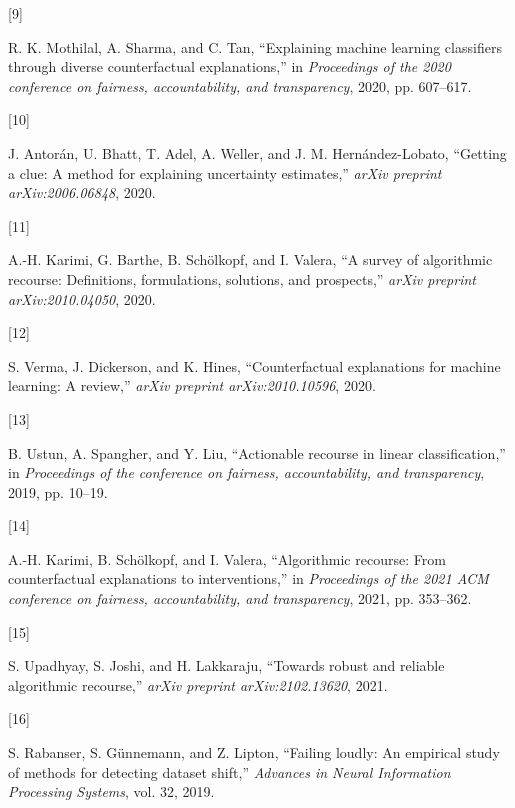 \documentclass[
  conference]{IEEEtran}
\newlength{\cslhangindent}
\newlength{\csllabelwidth}
\newlength{\cslentryspacingunit} %
\newenvironment{CSLReferences}[2] %
 {%
  \setlength{\parindent}{0pt}
  \ifodd #1
  \let\oldpar\par
  \def\par{\hangindent=\cslhangindent\oldpar}
  \fi
  \setlength{\parskip}{#2\cslentryspacingunit}
 }%
 {}
\newcommand{\CSLLeftMargin}[1]{\parbox[t]{\csllabelwidth}{#1}}
\newcommand{\CSLRightInline}[1]{\parbox[t]{\linewidth - \csllabelwidth}{#1}\break}
\begin{document}
\begin{CSLReferences}{0}{0}
\leavevmode{}%
\CSLLeftMargin{{[}9{]} }%
\CSLRightInline{R. K. Mothilal, A. Sharma, and C. Tan, {``Explaining
machine learning classifiers through diverse counterfactual
explanations,''} in \emph{Proceedings of the 2020 conference on
fairness, accountability, and transparency}, 2020, pp. 607--617.}

\leavevmode{}%
\CSLLeftMargin{{[}10{]} }%
\CSLRightInline{J. Antorán, U. Bhatt, T. Adel, A. Weller, and J. M.
Hernández-Lobato, {``Getting a clue: A method for explaining uncertainty
estimates,''} \emph{arXiv preprint arXiv:2006.06848}, 2020.}

\leavevmode{}%
\CSLLeftMargin{{[}11{]} }%
\CSLRightInline{A.-H. Karimi, G. Barthe, B. Schölkopf, and I. Valera,
{``A survey of algorithmic recourse: Definitions, formulations,
solutions, and prospects,''} \emph{arXiv preprint arXiv:2010.04050},
2020.}

\leavevmode{}%
\CSLLeftMargin{{[}12{]} }%
\CSLRightInline{S. Verma, J. Dickerson, and K. Hines, {``Counterfactual
explanations for machine learning: A review,''} \emph{arXiv preprint
arXiv:2010.10596}, 2020.}

\leavevmode{}%
\CSLLeftMargin{{[}13{]} }%
\CSLRightInline{B. Ustun, A. Spangher, and Y. Liu, {``Actionable
recourse in linear classification,''} in \emph{Proceedings of the
conference on fairness, accountability, and transparency}, 2019, pp.
10--19.}

\leavevmode{}%
\CSLLeftMargin{{[}14{]} }%
\CSLRightInline{A.-H. Karimi, B. Schölkopf, and I. Valera,
{``Algorithmic recourse: From counterfactual explanations to
interventions,''} in \emph{Proceedings of the 2021 ACM conference on
fairness, accountability, and transparency}, 2021, pp. 353--362.}

\leavevmode{}%
\CSLLeftMargin{{[}15{]} }%
\CSLRightInline{S. Upadhyay, S. Joshi, and H. Lakkaraju, {``Towards
robust and reliable algorithmic recourse,''} \emph{arXiv preprint
arXiv:2102.13620}, 2021.}

\leavevmode{}%
\CSLLeftMargin{{[}16{]} }%
\CSLRightInline{S. Rabanser, S. Günnemann, and Z. Lipton, {``Failing
loudly: An empirical study of methods for detecting dataset shift,''}
\emph{Advances in Neural Information Processing Systems}, vol. 32,
2019.}


\end{CSLReferences}
\end{document}

